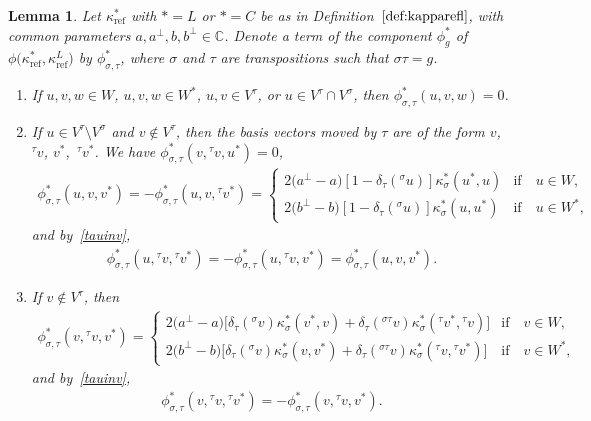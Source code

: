\documentclass[pdftex]{sigma}
\numberwithin{equation}{section}
\newtheorem{Lemma}[Theorem]{Lemma}
\newcommand{\actby}[1]{{}^{#1}}
\newcommand{\actbylessspace}[1]{{}^{#1}\!}
\DeclareMathOperator{\refl}{ref}
\begin{document}
\begin{Lemma}\label{lemma:simplification*2L2}
Let $\kappa^*_{\refl}$ with $*=L$ or $*=C$ be as in Definition~$\ref{def:kapparefl}$,
with common parameters $a, a^\perp, b, b^\perp \in \mathbb{C}$.
Denote a term of the component $\phi^*_g$ of $\phi\big(\kappa^*_{\refl},\kappa^L_{\refl}\big)$
by $\phi^*_{\sigma,\tau}$, where $\sigma$ and $\tau$ are transpositions
such that $\sigma \tau = g$.
	\begin{enumerate}[label={$\arabic*.$}]\itemsep=0pt
		\item[$(1)$] %
If $u,v,w \in W$, $u,v,w \in W^*$, $u,v\in V^{\tau}$, or
		$u \in V^{\tau}\cap V^{\sigma}$, then $\phi^{*}_{\sigma,\tau}(u,v,w)=0$.
		\item[$(2)$] %
If $u \in V^{\tau} \setminus V^{\sigma}$ and $v \notin V^\tau$, then the
		basis vectors moved by $\tau$ are of the form $v$, $\actby{\tau}v$, $v^*$,~$\actby{\tau}v^*$.
		We have $\phi^*_{\sigma,\tau}(v,\actbylessspace{\tau}v,u^*)=0$,
		\begin{gather*}
		\phi^*_{\sigma,\tau}(u,v,v^*)
		=-\phi^*_{\sigma,\tau}(u,v,\actbylessspace{\tau}v^*)
		=\begin{cases}
		2\big(a^\perp-a\big)[1-\delta_{\tau}(\actbylessspace{\sigma}u)]\kappa^*_{\sigma}(u^*,u)
& \text{if}\quad u \in W, \\
		2\big(b^\perp-b\big)[1-\delta_{\tau}(\actbylessspace{\sigma}u)]\kappa^*_{\sigma}(u,u^*)
& \text{if}\quad u \in W^*,
		\end{cases}
		\end{gather*}
		and by~\eqref{tauinv},
	\begin{gather*}
\phi^*_{\sigma,\tau}(u,\actby{\tau}v,\actby{\tau}v^*)=-\phi^*_{\sigma,\tau}(u,\actby{\tau}v,v^*) =\phi^*_{\sigma,\tau}(u,v,v^*).
\end{gather*}
		\item[$(3)$] %
If $v \notin V^{\tau}$, then
		\begin{gather*}
		\phi^*_{\sigma,\tau}(v,\actby{\tau}v,v^*)
		=\begin{cases}
		2\big(a^\perp-a\big)\big[\delta_{\tau}(\actbylessspace{\sigma}v)\kappa^*_{\sigma}(v^*,v) +\delta_{\tau}(\actby{\sigma\tau}v)\kappa^*_{\sigma}(\actbylessspace{\tau}v^*,\actbylessspace{\tau}v) \big] & \text{if}\quad v \in W,
\\
2\big(b^\perp-b\big)\big[\delta_{\tau}(\actbylessspace{\sigma}v)\kappa^*_{\sigma}(v,v^*) +\delta_{\tau}(\actby{\sigma\tau}v)\kappa^*_{\sigma}(\actbylessspace{\tau}v,\actbylessspace{\tau}v^*) \big] & \text{if}\quad v \in W^*,
		\end{cases}
		\end{gather*}
		and by~\eqref{tauinv},
		\begin{gather*}
		\phi^*_{\sigma,\tau}(v,\actbylessspace{\tau}v,\actbylessspace{\tau}v^*)
		=-\phi^*_{\sigma,\tau}(v,\actbylessspace{\tau}v,v^*).
		\end{gather*}
	\end{enumerate}
\end{Lemma}
\end{document}
